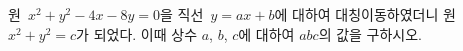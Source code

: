 원~$x^2+y^2-4x-8y=0$을 직선~$y=ax+b$에 대하여 대칭이동하였더니 원~$x^2+y^2=c$가 되었다. 이때 상수 $a$, $b$, $c$에 대하여 $abc$의 값을 구하시오.
